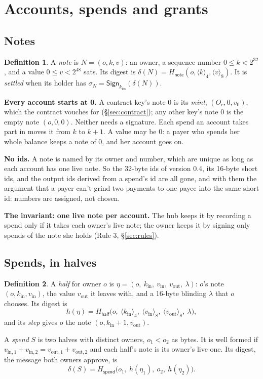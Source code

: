 \documentclass[11pt]{article}
\theoremstyle{plain}
\theoremstyle{definition}
\newtheorem{definition}{Definition}
\newcommand{\be}[2]{\langle #1\rangle_{#2}}
\newcommand{\Ht}[1]{H_{\textsf{#1}}}
\newcommand{\Sign}{\mathsf{Sign}}
\newcommand{\kiss}{k_{\mathrm{iss}}}
\newcommand{\Oc}{O_c}
\newcommand{\kin}{k_{\mathrm{in}}}
\newcommand{\vin}{v_{\mathrm{in}}}
\newcommand{\vout}{v_{\mathrm{out}}}
\begin{document}
\section{Accounts, spends and grants}

\subsection{Notes}\label{sec:notes}

\begin{definition}
A \emph{note} is $N = (o, k, v)$: an owner, a sequence number $0 \le k <
2^{32}$, and a value $0 \le v < 2^{48}$ sats. Its digest is $\delta(N) =
\Ht{note}(o, \be{k}{4}, \be{v}{8})$. It is \emph{settled} when its
holder has $\sigma_N = \Sign_{\kiss}(\delta(N))$.
\end{definition}

\textbf{Every account starts at 0.} A contract key's note 0 is its
\emph{mint}, $(\Oc, 0, v_0)$, which the contract vouches for
(\S\ref{sec:contract}); any other key's note 0 is the empty note $(o, 0,
0)$. Neither needs a signature. Each spend an account takes part in
moves it from $k$ to $k + 1$. A value may be 0: a payer who spends her
whole balance keeps a note of 0, and her account goes on.

\textbf{No ids.} A note is named by its owner and number, which are
unique as long as each account has one live note. So the
32-byte ids of version 0.4, its 16-byte short ids, and the output ids
derived from a spend's id are all gone, and with them the argument that
a payer can't grind two payments to one payee into the same short id:
numbers are assigned, not chosen.

\textbf{The invariant: one live note per account.} The hub keeps it by
recording a spend only if it takes each owner's live note; the owner
keeps it by signing only spends of the note she holds (Rule 3,
\S\ref{sec:rules}).

\subsection{Spends, in halves}\label{sec:spend}

\begin{definition}
A \emph{half} for owner $o$ is $\eta = (o,\ \kin,\ \vin,\ \vout,\
\lambda)$: $o$'s note $(o, \kin, \vin)$, the value $\vout$ it leaves
with, and a 16-byte blinding $\lambda$ that $o$ chooses. Its digest is
\[
  h(\eta) = \Ht{half}\big(o,\ \be{\kin}{4},\ \be{\vin}{8},\
  \be{\vout}{8},\ \lambda\big),
\]
and its \emph{step} gives $o$ the note $(o, \kin + 1, \vout)$.

A \emph{spend} $S$ is two halves with distinct owners, $o_1 < o_2$ as
bytes. It is well formed if $v_{\mathrm{in},1} + v_{\mathrm{in},2} =
v_{\mathrm{out},1} + v_{\mathrm{out},2}$ and each half's note is its
owner's live one. Its digest, the message both owners approve, is
\[
  \delta(S) = \Ht{spend}\big(o_1,\ h(\eta_1),\ o_2,\ h(\eta_2)\big).
\]
\end{definition}
\end{document}
